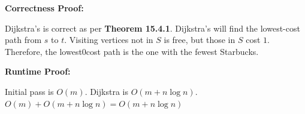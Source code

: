 \documentclass[11pt]{article}
\begin{document}
\bigbreak

\textbf{Correctness Proof:}

Dijkstra's is correct as per \textbf{Theorem 15.4.1}. 
Dijkstra's will find the lowest-cost path from $s$ to $t$. 
Visiting vertices not in $S$ is free, but those in $S$ cost $1$. 
Therefore, the lowest0cost path is the one with the fewest Starbucks. 

\bigbreak

\textbf{Runtime Proof:}

Initial pass is $O(m)$. Dijkstra is $O(m + n \log n)$. $O(m) + O(m + n \log n) = O(m + n \log n)$
\end{document}
